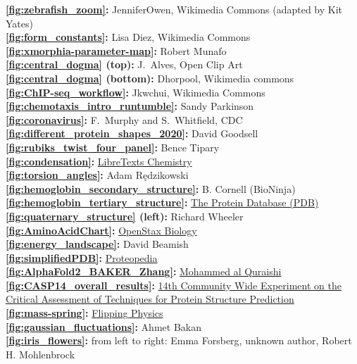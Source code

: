 \textbf{\autoref{fig:zebrafish_zoom}:} JenniferOwen, Wikimedia Commons (adapted by Kit Yates)\\
\textbf{\autoref{fig:form_constants}:} Lisa Diez, Wikimedia Commons\\
\textbf{\autoref{fig:xmorphia-parameter-map}:} Robert Munafo\\
\textbf{\autoref{fig:central_dogma} (top):} J.~Alves, Open Clip Art\\
\textbf{\autoref{fig:central_dogma} (bottom):} Dhorpool, Wikimedia commons\\
\textbf{\autoref{fig:ChIP-seq_workflow}:} Jkwchui, Wikimedia Commons\\
\textbf{\autoref{fig:chemotaxis_intro_runtumble}:} Sandy Parkinson\\
\textbf{\autoref{fig:coronavirus}:} F.~Murphy and S.~Whitfield, CDC\\
\textbf{\autoref{fig:different_protein_shapes_2020}:} David Goodsell\\
\textbf{\autoref{fig:rubiks_twist_four_panel}:} Bence Tipary\\
\textbf{\autoref{fig:condensation}:} \href{https://bit.ly/3q0Ph8V}{LibreTexts Chemistry}\\
\textbf{\autoref{fig:torsion_angles}:} Adam Rędzikowski\\
\textbf{\autoref{fig:hemoglobin_secondary_structure}:} B. Cornell (BioNinja)\\
\textbf{\autoref{fig:hemoglobin_tertiary_structure}:} \href{https://www.rcsb.org/structure/1SI4}{The Protein Database (PDB)}\\
\textbf{\autoref{fig:quaternary_structure} (left):} Richard Wheeler\\
\textbf{\autoref{fig:AminoAcidChart}:} \href{https://openstax.org/books/biology/pages/1-introduction}{OpenStax Biology}\\
\textbf{\autoref{fig:energy_landscape}:} David Beamish\\
\textbf{\autoref{fig:simplifiedPDB}:} \href{https://proteopedia.org/wiki/index.php/Atomic_coordinate_file}{Proteopedia}\\
\textbf{\autoref{fig:AlphaFold2_BAKER_Zhang}:} \href{https://bit.ly/39Mnym3}{Mohammed al Quraishi}\\
\textbf{\autoref{fig:CASP14_overall_results}:} \href{https://predictioncenter.org/casp14/zscores_final.cgi}{14th Community Wide Experiment on the Critical Assessment of Techniques for Protein Structure Prediction}\\
\textbf{\autoref{fig:mass-spring}:} \href{flippingphysics.com}{Flipping Physics}\\
\textbf{\autoref{fig:gaussian_fluctuations}:} Ahmet Bakan\\
\textbf{\autoref{fig:iris_flowers}:} from left to right: Emma Forsberg, unknown author, Robert H. Mohlenbrock\\



\clearpage
\thispagestyle{empty}
\phantom{}
